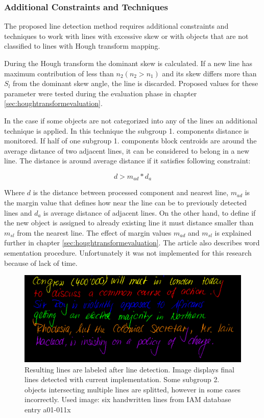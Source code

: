 \documentclass{article}
\begin{document}
          \subsubsection{Additional Constraints and Techniques}
            The proposed line detection method requires additional constraints and techniques to work with lines with excessive skew or with objects that are not classified to lines with Hough transform mapping.

            During the Hough transform the dominant skew is calculated. If a new line has maximum contribution of less than $n_2 (n_2 > n_1)$ and its skew differs more than $S_l$ from the dominant skew angle, the line is discarded. Proposed values for these parameter were tested during the evaluation phase in chapter \ref{sec:houghtransformevaluation}.

            In the case if some objects are not categorized into any of the lines an additional technique is applied. In this technique the subgroup 1. components distance is monitored. If half of one subgroup 1. components block centroids are around the average distance of two adjacent lines, it can be considered to belong in a new line. The distance is around average distance if it satisfies following constraint:

            \begin{equation}
              d >  m_{ad}*d_a
            \end{equation}

            Where $d$ is the distance between processed component and nearest line, $m_{ad}$ is the margin value that defines how near the line can be to previously detected lines and $d_a$ is average distance of adjacent lines. On the other hand, to define if the new object is assigned to already existing line it must distance smaller than $m_{sl}$ from the nearest line. The effect of margin values $m_{ad}$ and $m_{sl}$ is explained further in chapter \ref{sec:houghtransformevaluation}. The article \cite{Louloudis2} also describes word sementation procedure. Unfortunately it was not implemented for this research because of lack of time.

            \begin{figure}[!ht]
              \centering
              \includegraphics[natwidth=1433, natheight=574,scale=0.3]{011_lines_detail.png}
              \caption{Resulting lines are labeled after line detection. Image displays final lines detected with current implementation. Some subgroup 2. objects intersecting multiple lines are splitted, however in some cases incorrectly. Used image: six handwritten lines from IAM database entry a01-011x \label{fig:finallines} }
            \end{figure}
\end{document}
